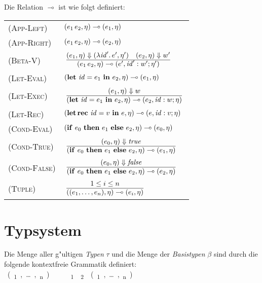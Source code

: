 \documentclass[12pt,fleqn,a4paper]{article}
\newcommand{\RN}[1]{\mbox{\textsc{(#1)}}}
\newcommand{\cl}{\name{cl}}
\begin{document}

\begin{definition}
  Die Relation $\multimap$ ist wie folgt definiert: \\[5mm]
  \begin{tabular}{ll}
    \RN{App-Left}   & $(e_1\,e_2,\eta) \multimap (e_1,\eta)$ \\[1mm]
    \RN{App-Right}  & $(e_1\,e_2,\eta) \multimap (e_2,\eta)$ \\[1mm]
    \RN{Beta-V}     & $\regel{(e_1,\eta) \Downarrow (\abstr{\id'}{e'},\eta')
                              \quad (e_2,\eta) \Downarrow w'}
                             {(\app{e_1}{e_2},\eta) \multimap (e',\id':w';\eta')}$ \\[3mm]
    \RN{Let-Eval}   & $(\mathbf{let}\ {\text{\it id\/}} = e_1\ \mathbf{in}\ e_2,\eta) \multimap (e_1,\eta)$ \\[1mm]
    \RN{Let-Exec}   & $\regel{(e_1,\eta) \Downarrow w}
                             {(\bli{\id}{e_1}{e_2},\eta) \multimap (e_2,\id:w;\eta)}$ \\[3mm]
    \RN{Let-Rec}    & $(\mathbf{let}\,\mathbf{rec}\ {\text{\it id\/}} = v\ \mathbf{in}\ e,\eta) \multimap (e,{\text{\it id\/}}:v;\eta)$ \\[1mm]
    \RN{Cond-Eval}  & $(\mathbf{if}\ e_0\ \mathbf{then}\ e_1\ \mathbf{else}\ e_2,\eta) \multimap (e_0,\eta)$ \\[1mm]
    \RN{Cond-True}  & $\regel{(e_0,\eta) \Downarrow \true}
                             {(\bifte{e_0}{e_1}{e_2},\eta) \multimap (e_1,\eta)}$ \\[3mm]
    \RN{Cond-False} & $\regel{(e_0,\eta) \Downarrow \false}
                             {(\bifte{e_0}{e_1}{e_2},\eta) \multimap (e_2,\eta)}$ \\[3mm]
    \RN{Tuple}      & $\regel{1 \le i \le n}
                             {((e_1,\ldots,e_n),\eta) \multimap (e_i,\eta)}$ \\[3mm]
  \end{tabular}
\end{definition}


\section{Typsystem}

\begin{definition}[Typen]
  Die Menge aller g"ultigen \emph{Typen} $\tau$ und die Menge der \emph{Basistypen} $\beta$ sind durch die folgende
  kontextfreie Grammatik definiert:
  \bgram
  \beta \is \bool \mid \z \mid \unit \mid (\beta_1,\ldots,\beta_n)
  \n
  \tau \is \beta \mid \tau_1 \to \tau_2 \mid (\tau_1,\ldots,\tau_n)
  \egram
\end{definition}
\end{document}
